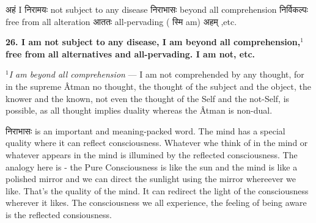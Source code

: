 \documentclass{article}
\begin{document}
{\begin{large}
\begin{center}
\begin{hindi}
    \end{hindi}
\end{center}
\end{large}

\texthindi{अहं}
I
\texthindi{निरामयः}
not subject to any disease
\texthindi{निराभासः}
beyond all comprehension
\texthindi{निर्विकल्पः}
free from all alteration
\texthindi{आततः}
all-pervading
(\texthindi{ स्मि}
am)
\texthindi{अहम्}
,etc.

\bigskip

\textbf{26. I am not subject to any disease, I am beyond all comprehension,$^1$
free from all alternatives and all-pervading. I am not, etc.}

{\small \textit{$^1$I am beyond all comprehension} --- I am not comprehended by
any thought, for in the supreme Âtman no thought, the thought of the subject
and the object, the knower and the known, not even the thought of the Self and
the not-Self, is possible, as all thought implies duality whereas the Âtman is
non-dual.}

\begin{oframed}

    \texthindi{निराभासः} is an important and meaning-packed word.  The mind has a
    special quality where it can reflect consciousness. Whatever whe think of
    in the mind or whatever appears in the mind is illumined by the reflected
    consciousness. The analogy here is - the Pure Consciousness is like the sun
    and the mind is like a polished mirror and we can direct the sunlight using
    the mirror whereever we like. That's the quality of the mind. It can
    redirect the light of the consciousness wherever it likes. The
    consciousness we all experience, the feeling of being aware is the
    reflected consiousness.


\end{oframed}}
\end{document}
